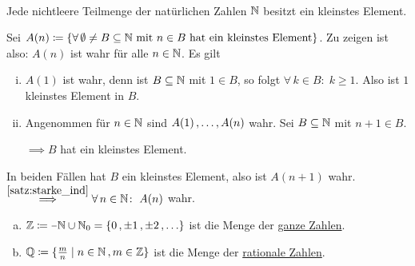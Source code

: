 \documentclass[../ana1.tex]{subfiles}
\begin{document}
\begin{satz}\label{satz:wohlordprinz} \leavevmode \\
	Jede nichtleere Teilmenge der natürlichen Zahlen \(\mathbb{N} \) besitzt ein kleinstes Element.
\end{satz}
\begin{bew}
	Sei \(A(n)\coloneqq \{\forall \, \emptyset \neq B \subseteq \mathbb{N} \text{ mit } n \in B \text{ hat ein kleinstes Element}\} \).
	Zu zeigen ist also: \(A(n) \) ist wahr für alle \(n \in \mathbb{N} \). Es gilt
	\begin{enumerate}[(i)]
		\item \(A(1) \) ist wahr, denn ist \(B \subseteq \mathbb{N} \) mit \(1 \in B \), so folgt \(\forall \, k \in B \colon \; k \geq 1 \).
			  Also ist \(1 \) kleinstes Element in \(B \).
		\item Angenommen für \(n \in \mathbb{N} \) sind \(A(1) \operatorname{,} \ldots \operatorname{,} A(n) \) wahr. Sei \(B \subseteq \mathbb{N} \) mit \(n + 1 \in B \).
		      \(\implies B \) hat ein kleinstes Element.
	\end{enumerate}
	In beiden Fällen hat \(B \) ein kleinstes Element, also ist \(A(n+1) \) wahr.\\
	\(\overset{\autoref{satz:starke_ind}}{\implies} \forall \, n \in \N \colon \; A(n) \) wahr.
\end{bew}

\iftoggle{short}{}{\newpage}%

\begin{notation}\leavevmode
	\begin{enumerate}[(a)]
		\item \(\Z \coloneqq \minus \N \cup \N_0 = \set{0 \ko \pm 1 \ko \pm 2  \ko \ldots} \) ist die Menge der \underline{ganze Zahlen}.
		\item \(\mathbb{Q} \coloneqq \{\frac{m}{n} \; \vert \; n \in \mathbb{N} \operatorname{,} m \in \mathbb{Z} \} \) ist die Menge der \underline{rationale Zahlen}.
	\end{enumerate}
\end{notation}
\end{document}
